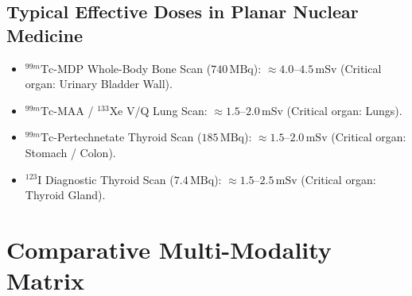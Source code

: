 \documentclass[11pt,a4paper]{article}
\begin{document}
\subsection{Typical Effective Doses in Planar Nuclear Medicine}
\begin{itemize}[leftmargin=*]
    \item $^{99m}\text{Tc}$-MDP Whole-Body Bone Scan ($740\,\text{MBq}$): $\approx 4.0\text{--}4.5\,\text{mSv}$ (Critical organ: Urinary Bladder Wall).
    \item $^{99m}\text{Tc}$-MAA / $^{133}\text{Xe}$ V/Q Lung Scan: $\approx 1.5\text{--}2.0\,\text{mSv}$ (Critical organ: Lungs).
    \item $^{99m}\text{Tc}$-Pertechnetate Thyroid Scan ($185\,\text{MBq}$): $\approx 1.5\text{--}2.0\,\text{mSv}$ (Critical organ: Stomach / Colon).
    \item $^{123}\text{I}$ Diagnostic Thyroid Scan ($7.4\,\text{MBq}$): $\approx 1.5\text{--}2.5\,\text{mSv}$ (Critical organ: Thyroid Gland).
\end{itemize}

\newpage
\section{Comparative Multi-Modality Matrix}
\end{document}
